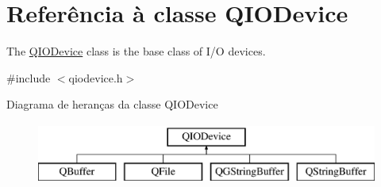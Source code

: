 \hypertarget{class_q_i_o_device}{\section{Referência à classe Q\-I\-O\-Device}
\label{class_q_i_o_device}
}


The \hyperlink{class_q_i_o_device}{Q\-I\-O\-Device} class is the base class of I/\-O devices.  




{\ttfamily \#include $<$qiodevice.\-h$>$}

Diagrama de heranças da classe Q\-I\-O\-Device\begin{figure}[H]
\begin{center}
\leavevmode
\includegraphics[height=2.000000cm]{class_q_i_o_device}
\end{center}
\end{figure}

